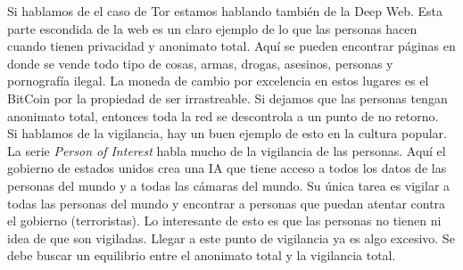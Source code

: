 \documentclass[a4paper,12pt]{article}
\begin{document}
\begin{enumerate}
 Si hablamos de el caso de Tor estamos hablando también de la Deep Web. Esta parte escondida de la web es un claro ejemplo de lo que las personas hacen cuando
 tienen privacidad y anonimato total. Aquí se pueden encontrar páginas en donde se vende todo tipo de cosas, armas, drogas, asesinos, personas y pornografía ilegal. La
 moneda de cambio por excelencia en estos lugares es el BitCoin por la propiedad de ser irrastreable. Si dejamos que las personas tengan anonimato total, entonces toda
 la red se descontrola a un punto de no retorno. \\
 Si hablamos de la vigilancia, hay un buen ejemplo de esto en la cultura popular. La serie \textit{Person of Interest} habla mucho de la vigilancia de las personas.
 Aquí el gobierno de estados unidos crea una IA que tiene acceso a todos los datos de las personas del mundo y a todas las cámaras del mundo. Su única tarea es
 vigilar a todas las personas del mundo y encontrar a personas que puedan atentar contra el gobierno (terroristas). Lo interesante de esto es que las personas no
 tienen ni idea de que son vigiladas. Llegar a este punto de vigilancia ya es algo excesivo. Se debe buscar un equilibrio entre el anonimato total y la vigilancia total.
 
\end{enumerate}
\end{document}
